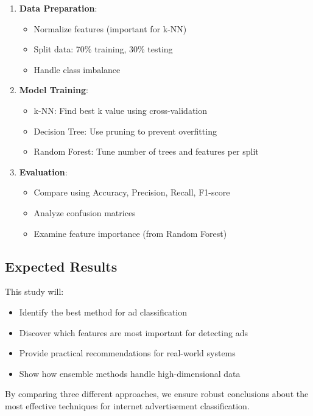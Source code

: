 \begin{enumerate}
    \item \textbf{Data Preparation}: 
    \begin{itemize}
        \item Normalize features (important for k-NN)
        \item Split data: 70\% training, 30\% testing
        \item Handle class imbalance
    \end{itemize}
    
    \item \textbf{Model Training}:
    \begin{itemize}
        \item k-NN: Find best k value using cross-validation
        \item Decision Tree: Use pruning to prevent overfitting
        \item Random Forest: Tune number of trees and features per split
    \end{itemize}
    
    \item \textbf{Evaluation}:
    \begin{itemize}
        \item Compare using Accuracy, Precision, Recall, F1-score
        \item Analyze confusion matrices
        \item Examine feature importance (from Random Forest)
    \end{itemize}
\end{enumerate}

\subsection{Expected Results}
This study will:
\begin{itemize}
    \item Identify the best method for ad classification
    \item Discover which features are most important for detecting ads
    \item Provide practical recommendations for real-world systems
    \item Show how ensemble methods handle high-dimensional data
\end{itemize}

By comparing three different approaches, we ensure robust conclusions about the most effective techniques for internet advertisement classification.